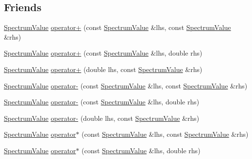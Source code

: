 \subsection*{Friends}
\begin{DoxyCompactItemize}
\item 
\hyperlink{classns3_1_1SpectrumValue}{Spectrum\+Value} \hyperlink{classns3_1_1SpectrumValue_a1399ad4f30563c8fbbd4332803b3c21d}{operator+} (const \hyperlink{classns3_1_1SpectrumValue}{Spectrum\+Value} \&lhs, const \hyperlink{classns3_1_1SpectrumValue}{Spectrum\+Value} \&rhs)
\item 
\hyperlink{classns3_1_1SpectrumValue}{Spectrum\+Value} \hyperlink{classns3_1_1SpectrumValue_ac6af41b57de0dfbb5b22aaffc14c4e71}{operator+} (const \hyperlink{classns3_1_1SpectrumValue}{Spectrum\+Value} \&lhs, double rhs)
\item 
\hyperlink{classns3_1_1SpectrumValue}{Spectrum\+Value} \hyperlink{classns3_1_1SpectrumValue_adaeb2b3fd2357dc7528abf5d2489ee56}{operator+} (double lhs, const \hyperlink{classns3_1_1SpectrumValue}{Spectrum\+Value} \&rhs)
\item 
\hyperlink{classns3_1_1SpectrumValue}{Spectrum\+Value} \hyperlink{classns3_1_1SpectrumValue_a00f98c8423d470042971f4bdd8c316ce}{operator-\/} (const \hyperlink{classns3_1_1SpectrumValue}{Spectrum\+Value} \&lhs, const \hyperlink{classns3_1_1SpectrumValue}{Spectrum\+Value} \&rhs)
\item 
\hyperlink{classns3_1_1SpectrumValue}{Spectrum\+Value} \hyperlink{classns3_1_1SpectrumValue_aa36244b20db9046822d97e0b59820887}{operator-\/} (const \hyperlink{classns3_1_1SpectrumValue}{Spectrum\+Value} \&lhs, double rhs)
\item 
\hyperlink{classns3_1_1SpectrumValue}{Spectrum\+Value} \hyperlink{classns3_1_1SpectrumValue_a0c9c1b1968bff6d9b3908bc36cb33ea4}{operator-\/} (double lhs, const \hyperlink{classns3_1_1SpectrumValue}{Spectrum\+Value} \&rhs)
\item 
\hyperlink{classns3_1_1SpectrumValue}{Spectrum\+Value} \hyperlink{classns3_1_1SpectrumValue_acac58ab7fd8842b6a0eced03691c28c4}{operator$\ast$} (const \hyperlink{classns3_1_1SpectrumValue}{Spectrum\+Value} \&lhs, const \hyperlink{classns3_1_1SpectrumValue}{Spectrum\+Value} \&rhs)
\item 
\hyperlink{classns3_1_1SpectrumValue}{Spectrum\+Value} \hyperlink{classns3_1_1SpectrumValue_a3a32e44f98b32d3c7887d8374c6dc187}{operator$\ast$} (const \hyperlink{classns3_1_1SpectrumValue}{Spectrum\+Value} \&lhs, double rhs)
\item 

\end{DoxyCompactItemize}
